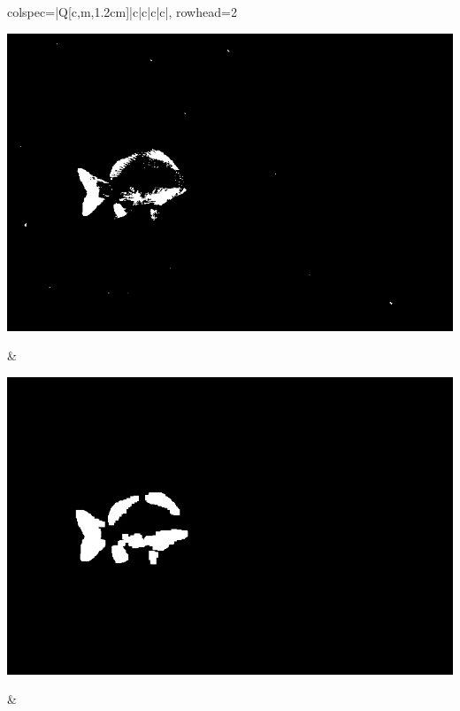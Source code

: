 \begin{longtblr}[
            caption = {Hasil uji coba proses \textit{background subtraction} menggunakan GMM yang disempurnakan oleh Operasi Morfologi},
            label = {tab:gmm_morph_9908}
        ]{
            colspec={|Q[c,m,1.2cm]|c|c|c|c|},
            rowhead=2
        }
\begin{minipage}{0.19\textwidth}
                \includegraphics[width=\linewidth]{image/9866/9866_gmm_frame509.jpg}
            \end{minipage} & 
            \begin{minipage}{0.19\textwidth}
                \includegraphics[width=\linewidth]{image/9866/9866_dilated_3x9_frame509.jpg}
            \end{minipage} &
            \begin{minipage}{0.19\textwidth}

\end{minipage}
\end{longtblr}
